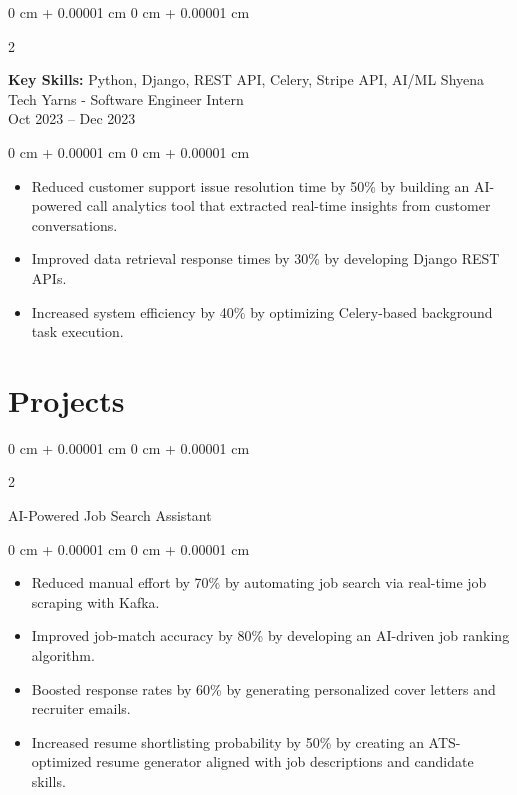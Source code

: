 \documentclass[10pt, letterpaper]{article}
\newenvironment{highlights}{
    \begin{itemize}[
        topsep=0.10 cm,
        parsep=0.10 cm,
        partopsep=0pt,
        itemsep=0pt,
        leftmargin=0 cm + 10pt
    ]
}{
    \end{itemize}
} %
\newenvironment{onecolentry}{
    \begin{adjustwidth}{
        0 cm + 0.00001 cm
    }{
        0 cm + 0.00001 cm
    }
}{
    \end{adjustwidth}
} %
\newenvironment{twocolentry}[2][]{
    \onecolentry
    \def\secondColumn{#2}
    \setcolumnwidth{\fill, 4.5 cm}
    \begin{paracol}{2}
}{
    \switchcolumn \raggedleft \secondColumn
    \end{paracol}
    \endonecolentry
} %
\begin{document}
        \vspace{0.2 cm}

        \begin{twocolentry}{
            Shyena Tech Yarns - Software Engineer Intern \\ Oct 2023 – Dec 2023
        }
            \textbf{Key Skills:} Python, Django, REST API, Celery, Stripe API, AI/ML\end{twocolentry}

        \vspace{0.10 cm}
        \begin{onecolentry}
            \begin{highlights}
                \item Reduced customer support issue resolution time by 50\% by building an AI-powered call analytics tool that extracted real-time insights from customer conversations.
                \item Improved data retrieval response times by 30\% by developing Django REST APIs.
                \item Increased system efficiency by 40\% by optimizing Celery-based background task execution.
            \end{highlights}
        \end{onecolentry}

    \section{Projects}

        \begin{twocolentry}{
            AI-Powered Job Search Assistant
        }
            \end{twocolentry}

        \vspace{0.10 cm}
        \begin{onecolentry}
            \begin{highlights}
                \item Reduced manual effort by 70\% by automating job search via real-time job scraping with Kafka.
                \item Improved job-match accuracy by 80\% by developing an AI-driven job ranking algorithm.
                \item Boosted response rates by 60\% by generating personalized cover letters and recruiter emails.
                \item Increased resume shortlisting probability by 50\% by creating an ATS-optimized resume generator aligned with job descriptions and candidate skills.
            \end{highlights}
        \end{onecolentry}
\end{document}
